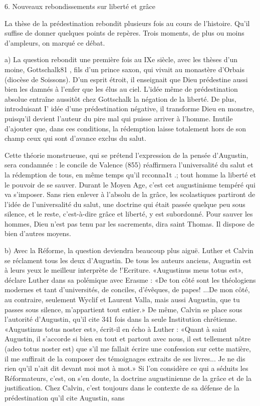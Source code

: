 6. Nouveaux	rebondissements sur liberté et	grâce

La thèse de la prédestination rebondit plusieurs fois au cours de l'histoire. Qu'il suffise de donner quelques points de repères. Trois moments, de plus ou moins d'ampleurs, on marqué ce débat.

a)	La question rebondit une première fois au IXe siècle, avec les thèses d'un moine, Gottschalk81 , fils d'un prince saxon, qui vivait au monastère d'Orbais (diocèse de Soissons). D'un esprit étroit, il enseignait que Dieu prédestine aussi bien les damnés à l'enfer que les élus au ciel. L'idée même de prédestination absolue entraîne aussitôt chez Gottschalk la négation de la liberté. De plus, introduisant I' idée d'une prédestination négative, il transforme Dieu en monstre, puisqu'il devient l'auteur du pire mal qui puisse arriver à l'homme. Inutile d'ajouter que, dans ces conditions, la rédemption laisse totalement hors de son champ ceux qui sont d'avance exclus du salut.

Cette théorie monstrueuse, qui se prétend l'expression de la pensée d'Augustin, sera condamnée : le concile de Valence (855) réaffirmera l'universalité du salut et la rédemption de tous, en même temps qu'il rcconna1t .; tout homme la liberté et le pouvoir de se sauver. Durant le Moyen Age, c'est cet augustinisme tempéré qui va s'imposer. Sans rien enlever à l'absolu de la grâce, les scolastiques partiront de l'idée de l'universalité du salut, une doctrine qui était passée quelque peu sous silence, et le reste, c'est-à-dire grâce et liberté, y est subordonné. Pour sauver les hommes, Dieu n'est pas tenu par les sacrements, dira saint Thomas. Il dispose de bien d'autres moyens.

b)	Avec  la  Réforme,  la  question  deviendra  beaucoup  plus  aiguë. Luther et Calvin se réclament tous les deux d'Augustin. De tous les auteurs anciens, Augustin est à leurs yeux le meilleur interprète de !'Ecriture. «Augustinus  meus totus est», déclare Luther dans sa polémique avec Erasme : «De ton côté sont les théologiens modernes et tant d'universités, de conciles, d'évêques, de papes! ...De mon côté, au contraire, seulement Wyclif et Laurent Valla, mais aussi Augustin, que tu passes sous silence, m'appartient tout entier.» De même, Calvin se place sous l'autorité  d'Augustin,  qu'il  cite  341  fois  dans  la  seule  Institution  chrétienne.
«Augustinus totus noster est», écrit-il en écho à Luther : «Quant à saint Augustin, il s'accorde si bien en tout et partout avec nous, il est tellement nôtre (adeo totus noster est) que s'il me fallait écrire une confession sur cette matière, il me suffirait de la composer des témoignages extraits de ses livres... Je ne dis rien qu'il n'ait dit devant moi mot à mot.» Si l'on considère ce qui a séduits les Réformateurs, c'est, on s'en doute, la doctrine augustinienne de la grâce et de la justification. Chez Calvin, c'est toujours dans le contexte de sa défense de la prédestination qu'il cite Augustin, sans

